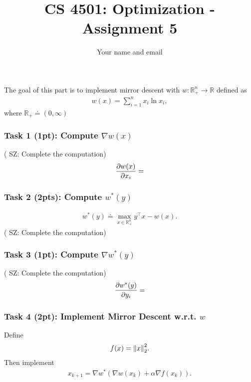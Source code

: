 \documentclass[11pt]{article}
\newcommand{\sz}[1]{({\color{blue} {SZ: #1}})}
\newcommand{\R}{\mathbb{R}}
\begin{document}
\title{CS 4501: Optimization - Assignment 5}
\author{Your name and email}
\date{}
\maketitle

\part{}

The goal of this part is to implement mirror descent with $w: \R^n_+ \to \R$ defined as
\begin{align}
  w(x) = \sum_{i=1}^n x_i \ln x_i,
\end{align}
where $\R_+ \doteq (0, \infty)$

\section*{Task 1 (1pt): Compute $\nabla w(x)$}
  \sz{Complete the computation}
\begin{align}
  \pdv{w(x)}{x_i} = 
\end{align}

\section*{Task 2 (2pts): Compute $w^*(y)$}
\begin{align}
  w^*(y) \doteq \max_{x \in \R^n_+} y^\top x - w(x).
\end{align}
  \sz{Complete the computation}

\section*{Task 3 (1pt): Compute $\nabla w^*(y)$}
  \sz{Complete the computation}
\begin{align}
  \pdv{w^*(y)}{y_i} = 
\end{align}

\section*{Task 4 (2pt): Implement Mirror Descent w.r.t. $w$}
Define 
\begin{align}
  f(x) = \norm{x}^2_2.
\end{align}
Then implement
\begin{align}
  x_{k+1} = \nabla w^*\left(\nabla w(x_k) + \alpha \nabla f(x_k)\right).
\end{align}
\end{document}
